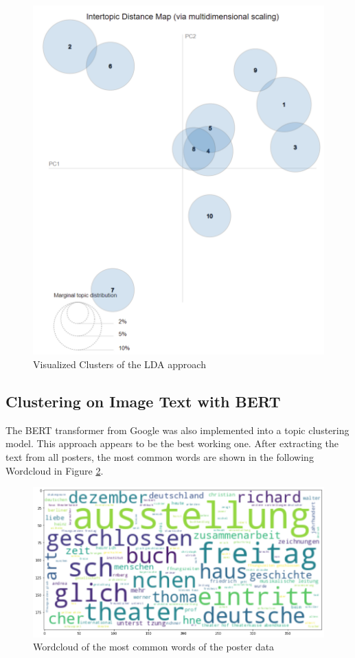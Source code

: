 \documentclass[conference]{IEEEtran}
\begin{document}
\begin{figure}
\centering
\includegraphics[width=1\linewidth]{../Imgs/lda_map}
\caption{Visualized Clusters of the LDA approach}
\label{fig:lda_example}
\end{figure}

\subsection{Clustering on Image Text with BERT}
The BERT transformer from Google was also implemented into a topic clustering model. This approach appears to be the best working one. After extracting the text from all posters, the most common words are shown in the following Wordcloud in Figure \ref{fig:wordcloud}.

\begin{figure}
\centering
\includegraphics[width=1\linewidth]{../Imgs/wordcloud}
\caption{Wordcloud of the most common words of the poster data}
\label{fig:wordcloud}
\end{figure}
\end{document}
